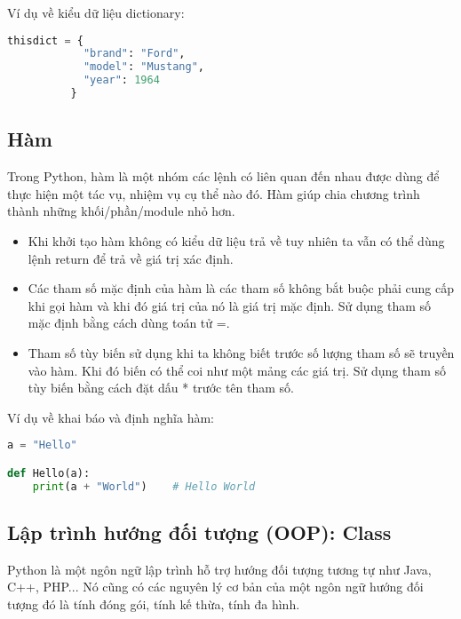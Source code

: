 \documentclass[../main-report.tex]{subfiles}
\begin{document}
\begin{itemize}
    \begin{example}
    Ví dụ về kiểu dữ liệu dictionary:
    \begin{lstlisting}[language=Python]
        thisdict = {
            "brand": "Ford",
            "model": "Mustang",
            "year": 1964
          }
    \end{lstlisting}
    \end{example}

\end{itemize}

\subsection{Hàm}
Trong Python, hàm là một nhóm các lệnh có liên quan đến nhau được dùng để
thực hiện một tác vụ, nhiệm vụ cụ thể nào đó. Hàm giúp chia chương trình thành
những khối/phần/module nhỏ hơn.

\begin{itemize}
\item Khi khởi tạo hàm không có kiểu dữ liệu trả về tuy nhiên ta vẫn có thể dùng lệnh return để
trả về giá trị xác định.

\item Các tham số mặc định của hàm là các tham số không bắt buộc phải cung cấp khi gọi hàm
và khi đó giá trị của nó là giá trị mặc định. Sử dụng tham số mặc định bằng cách dùng
toán tử =.

\item Tham số tùy biến sử dụng khi ta không biết trước số lượng tham số sẽ truyền vào hàm.
Khi đó biến có thể coi như một mảng các giá trị. Sử dụng tham số tùy biến bằng cách đặt
dấu * trước tên tham số.
\end{itemize}

\begin{example}
Ví dụ về khai báo và định nghĩa hàm:
\begin{lstlisting}[language=Python]
a = "Hello"

def Hello(a):
    print(a + "World")    # Hello World
\end{lstlisting}
\end{example}

\subsection{Lập trình hướng đối tượng (OOP): Class}
Python là một ngôn ngữ lập trình hỗ trợ hướng đối tượng tương tự như Java, C++, PHP... Nó
cũng có các nguyên lý cơ bản của một ngôn ngữ hướng đối tượng đó là tính đóng gói, tính kế
thừa, tính đa hình.
\end{document}
